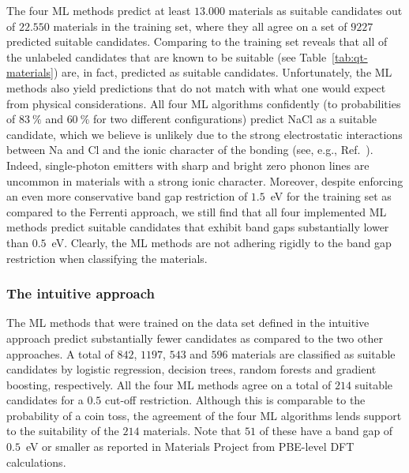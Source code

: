 \documentclass[superscriptaddress,unsortedaddress,
 amsmath,amssymb,
 aps,
]{revtex4-2}
\begin{document}
The four ML methods predict at least $13.000$ materials as suitable candidates out of $22.550$ materials in the training set, where they all agree on a set of $9227$ predicted suitable candidates. Comparing to the training set reveals that all of the unlabeled candidates that are known to be suitable (see Table~\ref{tab:qt-materials}) are, in fact, predicted as suitable candidates. Unfortunately, the ML methods also yield predictions that do not match with what one would expect from physical considerations. 
All four ML algorithms confidently (to probabilities of $83 \ \%$ and $60 \ \%$ for two different configurations) predict NaCl as a suitable candidate, which we believe is unlikely due to the strong electrostatic interactions between Na and Cl and the ionic character of the bonding (see, e.g., Ref.~\cite{Weber2010}).  
Indeed, single-photon emitters with sharp and bright zero phonon lines are uncommon in materials with a strong ionic character. 
Moreover, despite enforcing an even more conservative band gap restriction of $1.5$~eV for the training set as compared to the Ferrenti approach, we still find that all four implemented ML methods predict suitable candidates that exhibit band gaps substantially lower than $0.5$~eV.
Clearly, the ML methods are not adhering rigidly to the band gap restriction when classifying the materials. 
 
\subsubsection*{The intuitive approach}
The ML methods that were trained on the data set defined in the intuitive approach predict substantially fewer candidates as compared to the two other approaches. 
A total of $842$, $1197$, $543$ and $596$ materials are classified as suitable candidates by logistic regression, decision trees, random forests and gradient boosting, respectively. All the four ML methods agree on a total of $214$ suitable candidates for a $0.5$ cut-off restriction.  
Although this is comparable to the probability of a coin toss, the agreement of the four ML algorithms lends support to the suitability of the $214$ materials. 
Note that $51$ of these have a band gap of $0.5$~eV or smaller as reported in Materials Project from PBE-level DFT calculations.   

\end{document}
